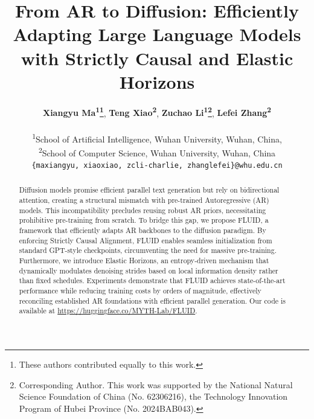 \documentclass[11pt]{article}
\title{From AR to Diffusion: Efficiently Adapting Large Language Models with Strictly Causal and Elastic Horizons}
\author{
 \textbf{Xiangyu Ma\textsuperscript{1}\thanks{These authors contributed equally to this work.}},
 \textbf{Teng Xiao\textsuperscript{2}\footnotemark[1]},
 \textbf{Zuchao Li\textsuperscript{1}\thanks{Corresponding Author. This work was supported by the National Natural Science Foundation of China (No. 62306216), the Technology Innovation Program of Hubei Province (No. 2024BAB043).}},
 \textbf{Lefei Zhang\textsuperscript{2}}
\\
\\
 \textsuperscript{1}School of Artificial Intelligence, Wuhan University, Wuhan, China,\\
 \textsuperscript{2}School of Computer Science, Wuhan University, Wuhan, China \\
 \texttt{\{maxiangyu, xiaoxiao, zcli-charlie, zhanglefei\}@whu.edu.cn}
}
\begin{document}
\maketitle
\begin{abstract}
Diffusion models promise efficient parallel text generation but rely on bidirectional attention, creating a structural mismatch with pre-trained Autoregressive (AR) models. This incompatibility precludes reusing robust AR priors, necessitating prohibitive pre-training from scratch. To bridge this gap, we propose FLUID, a framework that efficiently adapts AR backbones to the diffusion paradigm. By enforcing Strictly Causal Alignment, FLUID enables seamless initialization from standard GPT-style checkpoints, circumventing the need for massive pre-training. Furthermore, we introduce Elastic Horizons, an entropy-driven mechanism that dynamically modulates denoising strides based on local information density rather than fixed schedules. Experiments demonstrate that FLUID achieves state-of-the-art performance while reducing training costs by orders of magnitude, effectively reconciling established AR foundations with efficient parallel generation. Our code is available at \url{https://huggingface.co/MYTH-Lab/FLUID}.
\end{abstract}
\end{document}
